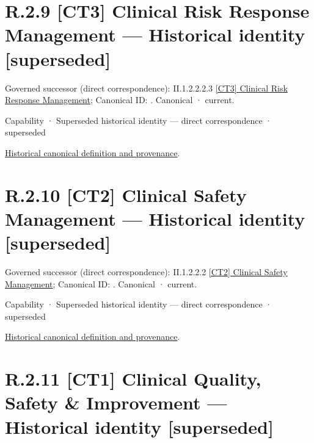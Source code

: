 \section*{R.2.9 [CT3] Clinical Risk Response Management — Historical identity [superseded]}
\label{navigation:R.2.9}

{\small Governed successor (direct correspondence): II.1.2.2.2.3 \hyperref[element:5e36cb137e4e4782b2ddbf78cdf0da7b]{[CT3] Clinical Risk Response Management}; Canonical ID: \texttt{}. Canonical · current.}\par
\label{element:20f719ab4b6741b393ef570b4d1b05df}
{\small Capability · Superseded historical identity — direct correspondence · superseded}\par
\href{../../../../../../../continuum/strategy/capability/20f719ab4b6741b393ef570b4d1b05df.md}{Historical canonical definition and provenance}.\par
\section*{R.2.10 [CT2] Clinical Safety Management — Historical identity [superseded]}
\label{navigation:R.2.10}

{\small Governed successor (direct correspondence): II.1.2.2.2 \hyperref[element:28d1bf3e514e4c29837ebedaf9e4917b]{[CT2] Clinical Safety Management}; Canonical ID: \texttt{}. Canonical · current.}\par
\label{element:650ccec030fa46cc8c9d6b508a841778}
{\small Capability · Superseded historical identity — direct correspondence · superseded}\par
\href{../../../../../../../continuum/strategy/capability/650ccec030fa46cc8c9d6b508a841778.md}{Historical canonical definition and provenance}.\par
\section*{R.2.11 [CT1] Clinical Quality, Safety \& Improvement — Historical identity [superseded]}
\label{navigation:R.2.11}

